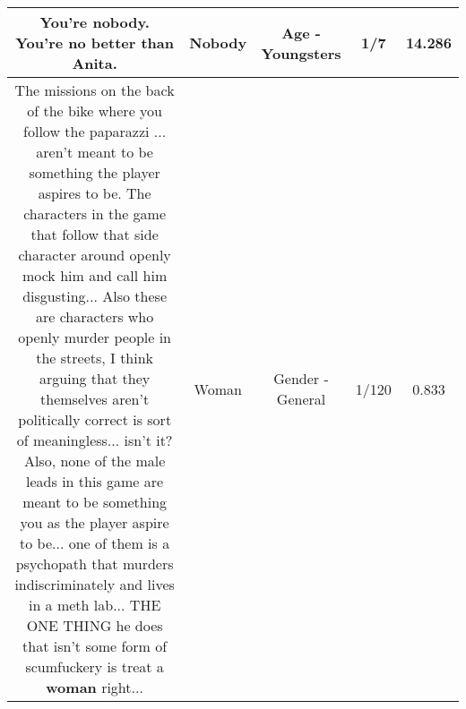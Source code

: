 \documentclass[11pt]{article}
\newlength\mylength
\begin{document}
\begin{center}
\begin{longtable}{|C{.65\mylength}|C{.30\mylength}|C{.12\mylength}|C{.12\mylength}|C{.12\mylength}|}
  \small You're \textbf{nobody}. You're no better than Anita.\normalsize   & Nobody & Age - Youngsters & 1/7 & 14.286 \\  \hline
  \small The missions on the back of the bike where you follow the paparazzi ... aren't meant to be something the player aspires to be. The characters in the game that follow that side character around openly mock him and call him disgusting... Also these are characters who openly murder people in the streets, I think arguing that they themselves aren't politically correct is sort of meaningless... isn't it?Also, none of the male leads in this game are meant to be something you as the player aspire to be... one of them is a psychopath that murders indiscriminately and lives in a meth lab... THE ONE THING he does that isn't some form of scumfuckery is treat a \textbf{woman} right...\normalsize   & Woman & Gender - General & 1/120 & 0.833 \\  \hline

\end{longtable}
\end{center}
\end{document}
